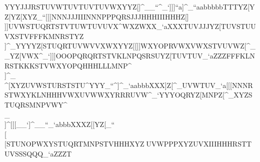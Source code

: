                                        YYYJJJRSTUVWTUVTUVTUVWXYYZ[]^__``^_`                                                            ]]]``a]^_``aabbbbbTTTYZ[YZ[YZ[XYZ_``                                                            [[[NNNJJJIIINNNPPPQRSJJJHHHIIIHHHZ[]                                                            \\\RSTOPROPRQRTPQSLNORSTLNOGHJMNP[\^                                                            \\\XYZNOPUVWSTULLLFFFFFFYZ[TUVRRR^_`                                                            ]]]UVWSTUQRTSTVTUWTUVUVX\]^WXZWXX_`a                                                            XXXTUVJJJYZ[TUVSTUUVXSTVFFFKMNRSTYZ\                                                            \\\NNNOPRQQQTUVTUVPQRSTUPPPLLLSTU]^_                                                            YYYYZ[STUQRTUVWVVXWXYYZ[[\][\]VWX__`                                                            \\\_`a_````a`aabbbUUUXYZ[[\XYZYZ[_``                                                            \\\FFFFFFKKKJJJOOONNNNNNLLLOPQFFFXY[                                                            [[[NOQNOQTUWPQRUVX\]^UVXNOQJLMZ[\[\^                                                            ]]]WXYOPRVWXVWXSTVUVWZ[\^__YZ[VWX^_`                                                            ]]]OOOPQRQRTSTVKLNPQSRSUYZ[TUVTUV_`a                                                            ZZZFFFKLNRSTKKKSTVWXYOPQHHHLLLMNP\]^                                                            \\\STUQRSTTTVWXRRRVWXSTUUVWXYZPQR]^_                                                            \\\PQSPQSZ[\\]^[\]XYZUVWSTURSTSTU\]^                                                            YYY_``\]^]^_`aabbbXXX\]]Z[\WXYYZ[__`                                                            [[[NNNMMMTUVPQRSTUKKKQRSOPQNOPLMOXYZ                                                            [[[RST_`a[\]YZ[^_`_`aVWXWXYUWXUVXYZ[                                                            ^^^UVWMMMUVXVWXKLNKKKUVW]^_UVWTUV_`a                                                            [[[NNNRSTWXYKLNHHHVWXUVWWXYRRRUVW^_`                                                            YYYOQRYZ[MNPZ[\]^_XYZSTUQRSMNPVWY\]^                                                            \\\RSTQQQRRRPPPRRRRRRRRRQQQLLLKKK\]_                                                            \\\HHHSTUUVWRSTUVWUVWWXYYZ[XYZ[\]]]^                                                            [[[__`]^__``_`abbbXXXZ[\XYZYZ[YZ[_``                                                            \\\QRTOOOQRSPQRPQRKKKLLLFFFIIIJJJYZ[                                                            \\\XYZ[\]STUNOPWXYSTUQRTMNPSTVHHHXYZ                                                            ^^^UVWPPPXYZUVXIIIHHHRSTTUVSSSQQQ_`a                                                            ZZZT